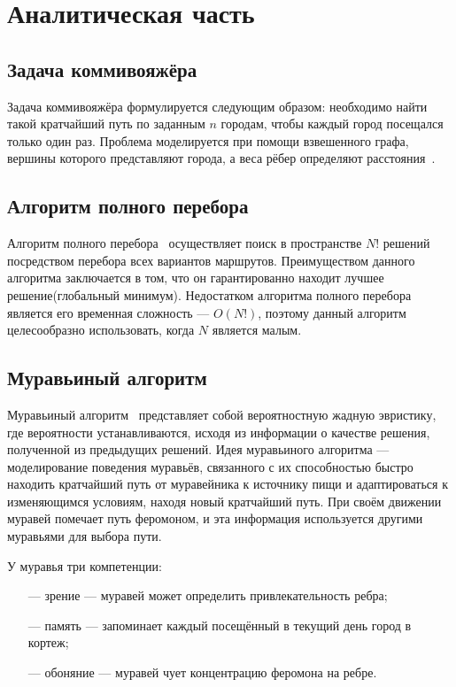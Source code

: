 \chapter{Аналитическая часть}
\section{Задача коммивояжёра}

Задача коммивояжёра формулируется следующим образом: необходимо найти такой кратчайший путь по заданным $n$ городам, чтобы каждый город посещался только один раз. Проблема моделируется при помощи взвешенного графа, вершины которого представляют города, а веса рёбер определяют расстояния~\cite{Levitin2006}.


\section{Алгоритм полного перебора}

Алгоритм полного перебора~\cite{Boroznov2009} осуществляет поиск в пространстве $N!$ решений посредством перебора всех вариантов маршрутов. Преимуществом данного алгоритма заключается в том, что он гарантированно находит лучшее решение(глобальный минимум). Недостатком алгоритма полного перебора является его временная сложность --- $O(N!)$, поэтому данный алгоритм целесообразно использовать, когда $N$ является малым.


\section{Муравьиный алгоритм}

Муравьиный алгоритм~\cite{Shtovba2003} представляет собой вероятностную жадную эвристику, где вероятности устанавливаются, исходя из информации о качестве решения, полученной из предыдущих решений. Идея муравьиного алгоритма --- моделирование поведения муравьёв, связанного с их способностью быстро находить кратчайший путь от муравейника к источнику пищи и адаптироваться к изменяющимся условиям, находя новый кратчайший путь. При своём движении муравей помечает путь феромоном, и эта информация используется другими муравьями для выбора пути.

У муравья три компетенции:
\begin{itemize}
	\item[---] зрение --- муравей может определить привлекательность ребра;
	\item[---] память --- запоминает каждый посещённый в текущий день город в кортеж;
	\item[---] обоняние --- муравей чует концентрацию феромона на ребре.
\end{itemize}

